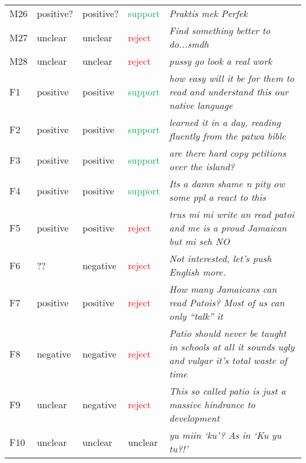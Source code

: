\documentclass[output=paper,colorlinks,citecolor=brown]{langscibook}
\begin{document}
\begin{longtable}{llllp{6cm}}
 {M26} & {positive?} & {positive?} & {\textcolor[HTML]{00B050}{support}} & {\textit{\textcolor[HTML]{1C1E21}{Praktis mek Perfek}}} \\
 {M27} & {unclear} & {unclear} & {\textcolor[HTML]{FF0000}{reject}} & {\textit{\textcolor[HTML]{1C1E21}{Find something better to do...smdh}}} \\
 {M28} & {unclear} & {unclear} & {\textcolor[HTML]{FF0000}{reject}} & {\textit{\textcolor[HTML]{1C1E21}{pussy go look a real work}}} \\
 {F1} & {positive} & {positive} & {\textcolor[HTML]{00B050}{support}} & {\textit{\textcolor[HTML]{1C1E21}{how easy will it be for them to read and understand this our native language}}} \\
 {F2} & {positive} & {positive} & {\textcolor[HTML]{00B050}{support}} & {\textit{\textcolor[HTML]{1C1E21}{learned it in a day, reading fluently from the patwa bible}}} \\
 {F3} & {positive} & {positive} & {\textcolor[HTML]{00B050}{support}} & {\textit{\textcolor[HTML]{1C1E21}{are there hard copy petitions over the island?}}} \\
 {F4} & {positive} & {positive} & {\textcolor[HTML]{00B050}{support}} & {\textit{\textcolor[HTML]{1C1E21}{Its a damn shame n pity ow some ppl a react to this}}} \\
 {F5} & {positive} & {positive} & {\textcolor[HTML]{FF0000}{reject}} & {\textit{\textcolor[HTML]{1C1E21}{trus mi mi write an read patoi and me is a proud Jamaican but mi seh NO}}} \\
 {F6} & {??} & {negative} & {\textcolor[HTML]{FF0000}{reject}} & {\textit{\textcolor[HTML]{1C1E21}{Not interested, let's push English more.}}} \\
 {F7} & {positive} & {positive} & {\textcolor[HTML]{FF0000}{reject}} & {\textit{\textcolor[HTML]{1C1E21}{How many Jamaicans can read Patois? Most of us can only ``talk'' it}}} \\
 {F8} & {negative} & {negative} & {\textcolor[HTML]{FF0000}{reject}} & {\textit{\textcolor[HTML]{1C1E21}{Patio should never be taught in schools at all it sounds ugly and vulgar it's total waste of time}}} \\
 {F9} & {unclear} & {negative} & {\textcolor[HTML]{FF0000}{reject}} & {\textit{\textcolor[HTML]{1C1E21}{This so called patio is just a massive hindrance to development}}} \\
 {F10} & {unclear} & {unclear} & {unclear} & {\textit{\textcolor[HTML]{1C1E21}{yu miin `ku'? As in `Ku yu tu?!'}}} \\

\end{longtable}
\end{document}
